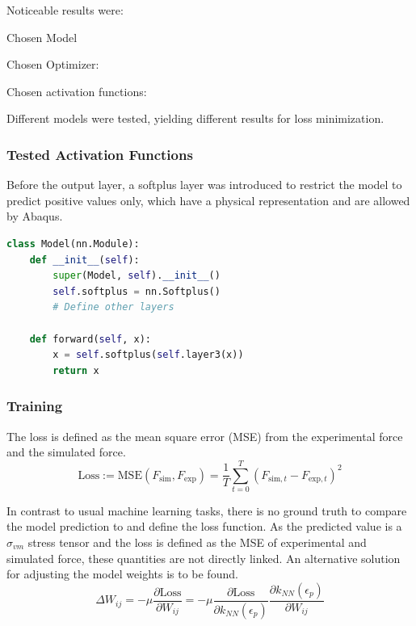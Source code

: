 Noticeable results were:

Chosen Model

Chosen Optimizer:

Chosen activation functions:

Different models were tested, yielding different results for loss minimization.

\subsubsection{Tested Activation Functions}
Before the output layer, a softplus layer was introduced to restrict the model to predict positive values only, which have a physical representation and are allowed by Abaqus.

\begin{lstlisting}[language=Python]
class Model(nn.Module):
    def __init__(self):
        super(Model, self).__init__()
        self.softplus = nn.Softplus()
        # Define other layers

    def forward(self, x):
        x = self.softplus(self.layer3(x))
        return x
\end{lstlisting}

\subsubsection{Training}
The loss is defined as the mean square error (MSE) from the experimental force and the simulated force.
\begin{equation}
\text{Loss} := \text{MSE}(F_{\text{sim}}, F_{\text{exp}}) = \frac{1}{T} \sum_{t = 0}^{T} \left( F_{\text{sim}, t} - F_{\text{exp}, t} \right)^2
\end{equation}

In contrast to usual machine learning tasks, there is no ground truth to compare the model prediction to and define the loss function. As the predicted value is a $\sigma_{vm}$ stress tensor and the loss is defined as the MSE of experimental and simulated force, these quantities are not directly linked. An alternative solution for adjusting the model weights is to be found.
\begin{equation}
\Delta W_{ij} = - \mu \frac{\partial \text{Loss}}{\partial W_{ij}} = - \mu \frac{\partial \text{Loss}}{\partial k_{NN}(\epsilon_p)} \frac{\partial k_{NN}(\epsilon_p)}{\partial W_{ij}}
\end{equation}

